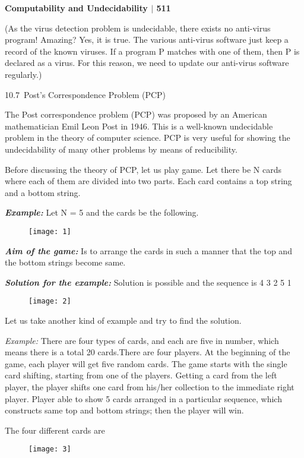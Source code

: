 \documentclass[10pt,a4paper]{book}
\begin{document}
\footnotesize

\begin{flushright}
\textsf{\textbf{  Computability and Undecidability $|$ 511}}
\end{flushright}

(As the virus detection problem is undecidable, there exists no anti-virus program! Amazing? Yes, it is
true. The various anti-virus software just keep a record of the known viruses. If a program P matches with one of them, then P is declared as a virus. For this reason, we need to update our anti-virus software regularly.)

\begin{flushleft}
\large
\textsf{10.7\, Post’s Correspondence Problem (PCP)}
\end{flushleft}
\begin{flushleft}
The Post correspondence problem (PCP) was proposed by an American mathematician Emil Leon Post in 1946. This is a well-known undecidable problem in the theory of computer science. PCP is very useful for showing the undecidability of many other problems by means of reducibility.


\qquad Before discussing the theory of PCP, let us play game. Let there be N cards where each of them are
divided into two parts. Each card contains a top string and a bottom string.

\quad

\textit{\textbf{Example:}} Let N = 5 and the cards be the following.
\end{flushleft}
\begin{figure}[h]
  \centering
  \texttt{[image: 1]}\\
\end{figure}
\textit{\textbf{Aim of the game:}} Is to arrange the cards in such a manner that the top and the bottom strings become same.

\quad

\textit{\textbf{\!\!\!\!\!\!\!\!\!\!Solution for the example:}} Solution is possible and the sequence is 4 3 2 5 1

\begin{figure}[h]
  \centering
  \texttt{[image: 2]}
\end{figure}

Let us take another kind of example and try to find the solution.

\quad

\emph{\!\!\!\!\!\!\!\!\!\!Example:} There are four types of cards, and each are five in number, which means there is a total 20 cards.There are four players. At the beginning of the game, each player will get five random cards. The game starts with the single card shifting, starting from one of the players. Getting a card from the left player, the player shifts one card from his/her collection to the immediate right player. Player able to show 5 cards arranged in a particular sequence, which constructs same top and bottom strings; then the player will win.

The four different cards are

\begin{figure}[h]
  \centering
  \texttt{[image: 3]}
\end{figure}
\end{document}
